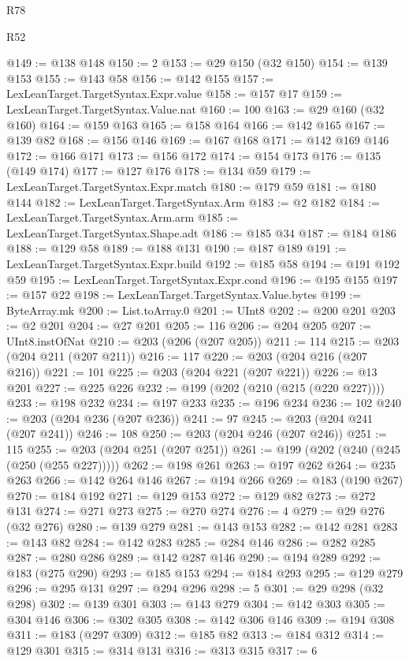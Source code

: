 \begin{lexlean}{R78}
\begin{lexlean}{R52}
\begin{coremodule}
{{{{{{{{{{{{{{{{{{{{{{{{{{{{{{{{{{{{{{{{{{{{{{{{{{{{{{{{{{{{{{{{{{{{{{{{{{{{{{{{{{{{{{{{{{{{{{{{{{{{{{{{{{{{{{{{{{{{{{{{{{{{{{{{{{{{{{{{{{{{{{{{{{{{{{{{{{{{{{{{{{{{{{{{{{{{{{{{{{{{{{{{{{{{{{{{{{{{{{@149 := @138 @148
@150 := 2
@153 := @29 @150 (@32 @150)
@154 := @139 @153
@155 := @143 @58
@156 := @142 @155
@157 := LexLeanTarget.TargetSyntax.Expr.value
@158 := @157 @17
@159 := LexLeanTarget.TargetSyntax.Value.nat
@160 := 100
@163 := @29 @160 (@32 @160)
@164 := @159 @163
@165 := @158 @164
@166 := @142 @165
@167 := @139 @82
@168 := @156 @146
@169 := @167 @168
@171 := @142 @169 @146
@172 := @166 @171
@173 := @156 @172
@174 := @154 @173
@176 := @135 (@149 @174)
@177 := @127 @176
@178 := @134 @59
@179 := LexLeanTarget.TargetSyntax.Expr.match
@180 := @179 @59
@181 := @180 @144
@182 := LexLeanTarget.TargetSyntax.Arm
@183 := @2 @182
@184 := LexLeanTarget.TargetSyntax.Arm.arm
@185 := LexLeanTarget.TargetSyntax.Shape.adt
@186 := @185 @34
@187 := @184 @186
@188 := @129 @58
@189 := @188 @131
@190 := @187 @189
@191 := LexLeanTarget.TargetSyntax.Expr.build
@192 := @185 @58
@194 := @191 @192 @59
@195 := LexLeanTarget.TargetSyntax.Expr.cond
@196 := @195 @155
@197 := @157 @22
@198 := LexLeanTarget.TargetSyntax.Value.bytes
@199 := ByteArray.mk
@200 := List.toArray.{0}
@201 := UInt8
@202 := @200 @201
@203 := @2 @201
@204 := @27 @201
@205 := 116
@206 := @204 @205
@207 := UInt8.instOfNat
@210 := @203 (@206 (@207 @205))
@211 := 114
@215 := @203 (@204 @211 (@207 @211))
@216 := 117
@220 := @203 (@204 @216 (@207 @216))
@221 := 101
@225 := @203 (@204 @221 (@207 @221))
@226 := @13 @201
@227 := @225 @226
@232 := @199 (@202 (@210 (@215 (@220 @227))))
@233 := @198 @232
@234 := @197 @233
@235 := @196 @234
@236 := 102
@240 := @203 (@204 @236 (@207 @236))
@241 := 97
@245 := @203 (@204 @241 (@207 @241))
@246 := 108
@250 := @203 (@204 @246 (@207 @246))
@251 := 115
@255 := @203 (@204 @251 (@207 @251))
@261 := @199 (@202 (@240 (@245 (@250 (@255 @227)))))
@262 := @198 @261
@263 := @197 @262
@264 := @235 @263
@266 := @142 @264 @146
@267 := @194 @266
@269 := @183 (@190 @267)
@270 := @184 @192
@271 := @129 @153
@272 := @129 @82
@273 := @272 @131
@274 := @271 @273
@275 := @270 @274
@276 := 4
@279 := @29 @276 (@32 @276)
@280 := @139 @279
@281 := @143 @153
@282 := @142 @281
@283 := @143 @82
@284 := @142 @283
@285 := @284 @146
@286 := @282 @285
@287 := @280 @286
@289 := @142 @287 @146
@290 := @194 @289
@292 := @183 (@275 @290)
@293 := @185 @153
@294 := @184 @293
@295 := @129 @279
@296 := @295 @131
@297 := @294 @296
@298 := 5
@301 := @29 @298 (@32 @298)
@302 := @139 @301
@303 := @143 @279
@304 := @142 @303
@305 := @304 @146
@306 := @302 @305
@308 := @142 @306 @146
@309 := @194 @308
@311 := @183 (@297 @309)
@312 := @185 @82
@313 := @184 @312
@314 := @129 @301
@315 := @314 @131
@316 := @313 @315
@317 := 6
}}}}}}}}}}}}}}}}}}}}}}}}}}}}}}}}}}}}}}}}}}}}}}}}}}}}}}}}}}}}}}}}}}}}}}}}}}}}}}}}}}}}}}}}}}}}}}}}}}}}}}}}}}}}}}}}}}}}}}}}}}}}}}}}}}}}}}}}}}}}}}}}}}}}}}}}}}}}}}}}}}}}}}}}}}}}}}}}}}}}}}}}}}}}}}}}}}}}}}
\end{coremodule}
\end{lexlean}
\end{lexlean}
